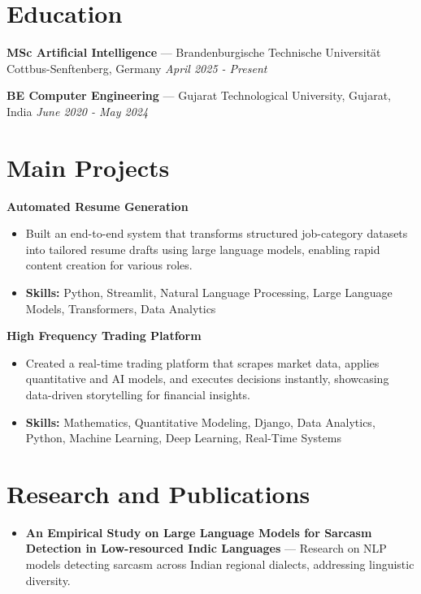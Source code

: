 \documentclass[a4paper,10pt]{article}
\begin{document}
\section*{Education}
\textbf{MSc Artificial Intelligence} — Brandenburgische Technische Universität Cottbus-Senftenberg, Germany \hfill \textit{April 2025 - Present}\par
\vspace{1.5pt}
\textbf{BE Computer Engineering} — Gujarat Technological University, Gujarat, India \hfill \textit{June 2020 - May 2024}\par

\section*{Main Projects}
\textbf{Automated Resume Generation}\par
\vspace{1pt}
\begin{itemize}
  \item Built an end-to-end system that transforms structured job-category datasets into tailored resume drafts using large language models, enabling rapid content creation for various roles.
  \item \textbf{Skills:} Python, Streamlit, Natural Language Processing, Large Language Models, Transformers, Data Analytics
\end{itemize}
\vspace{3pt}
\textbf{High Frequency Trading Platform}\par
\vspace{1pt}
\begin{itemize}
  \item Created a real-time trading platform that scrapes market data, applies quantitative and AI models, and executes decisions instantly, showcasing data-driven storytelling for financial insights.
  \item \textbf{Skills:} Mathematics, Quantitative Modeling, Django, Data Analytics, Python, Machine Learning, Deep Learning, Real-Time Systems
\end{itemize}

\section*{Research and Publications}
\begin{itemize}
\item \textbf{An Empirical Study on Large Language Models for Sarcasm Detection in Low-resourced Indic Languages} — Research on NLP models detecting sarcasm across Indian regional dialects, addressing linguistic diversity.
\end{itemize}
\end{document}
